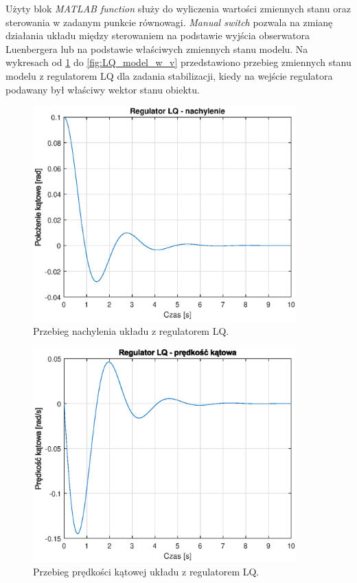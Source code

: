 \documentclass[11pt,a4paper]{article}
\begin{document}
Użyty blok \textit{MATLAB function} służy do wyliczenia wartości zmiennych stanu oraz sterowania w zadanym punkcie równowagi. \textit{Manual switch} pozwala na zmianę działania układu między sterowaniem na podstawie wyjścia obserwatora Luenbergera lub na podstawie właściwych zmiennych stanu modelu. Na wykresach od \ref{fig:LQ_model_alpha_v} do \ref{fig:LQ_model_w_v} przedstawiono przebieg zmiennych stanu modelu z regulatorem LQ dla zadania stabilizacji, kiedy na wejście regulatora podawany był właściwy wektor stanu obiektu.

\begin{figure}[H]
	\centering
	\includegraphics[width=4in]{Figures/LQ_model_alpha_v.eps}
	\caption{Przebieg nachylenia układu z regulatorem LQ.}
	\label{fig:LQ_model_alpha_v}
\end{figure}

\begin{figure}[H]
	\centering
	\includegraphics[width=4in]{Figures/LQ_model_dalpha_v.eps}
	\caption{Przebieg prędkości kątowej układu z regulatorem LQ.}
	\label{fig:LQ_model_dalpha_v}
\end{figure}
\end{document}
